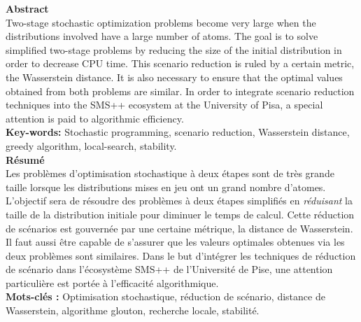 \documentclass{amsart}
\begin{document}
\begin{titlepage}

    \vspace*{1cm}
        \Large\textbf{Abstract} \\
    
    \normalsize Two-stage stochastic optimization problems become very large when the distributions involved have a large number of atoms. The goal is to solve simplified two-stage problems by reducing the size of the initial distribution in order to decrease CPU time. This scenario reduction is ruled by a certain metric, the Wasserstein distance. It is also necessary to ensure that the optimal values obtained from both problems are similar. In order to integrate scenario reduction techniques into the SMS++ ecosystem at the University of Pisa, a special attention is paid to algorithmic efficiency. \\ 
    
    \textbf{Key-words:} Stochastic programming, scenario reduction, Wasserstein distance, greedy algorithm, local-search, stability.
  \\

        \vspace*{1cm}
        \Large\textbf{Résumé} \\
    
    \normalsize Les problèmes d'optimisation stochastique à deux étapes sont de très grande taille lorsque les distributions mises en jeu ont un grand nombre d'atomes. L'objectif sera de résoudre des problèmes à deux étapes simplifiés en \emph{réduisant} la taille de la distribution initiale pour diminuer le temps de calcul. Cette réduction de scénarios est gouvernée par une certaine métrique, la distance de Wasserstein. Il faut aussi être capable de s'assurer que les valeurs optimales obtenues via les deux problèmes sont similaires. Dans le but d'intégrer les techniques de réduction de scénario dans l'écosystème SMS++ de l'Université de Pise, une attention particulière est portée à l'efficacité algorithmique. \\
    
    \textbf{Mots-clés :} Optimisation stochastique, réduction de scénario, distance de Wasserstein, algorithme glouton, recherche locale, stabilité.
    
\end{titlepage}


\tableofcontents

\newpage
\pagestyle{fancy} %
\fancyfoot[R]{\thepage/\pageref{LastPage}} 
\end{document}
